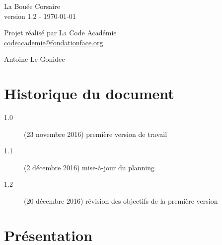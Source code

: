 \documentclass[french]{article}
\begin{document}
	
	\begin{titlepage}
		\begin{center}
			
			\vspace*{\fill}
			
			{\Huge
				La Bouée Corsaire
			}\\ [0.5cm]
			{\large
				version 1.2 - \today
			}\\
			
			\vspace*{\fill}
			
			{\Large
				Projet réalisé par La Code Académie
			}\\ [0.5cm]
			{\large
				\href{mailto:codeacademie@fondationface.org}{
					codeacademie@fondationface.org
				}
			}\\
			
			\vspace*{\fill}
			
			{\Large
				Antoine Le Gonidec
			}
			
			\vspace*{\fill}
			
		\end{center}
	\end{titlepage}
	
	\newpage
	\tableofcontents
	
	\newpage
	\section{Historique du document}
	\begin{description}
		\item [1.0] (23 novembre 2016) première version de travail
		\item [1.1] (2 décembre 2016) mise-à-jour du planning
		\item [1.2] (20 décembre 2016) révision des objectifs de la première version
	\end{description}
	
	\newpage
	\section{Présentation}
\end{document}
